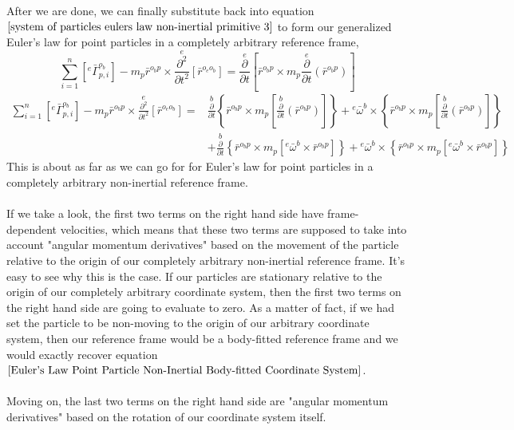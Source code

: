After we are done, we can finally substitute back into equation $\ref{system of particles eulers law non-inertial primitive 3}$ to form our generalized Euler's law for point particles in a completely arbitrary reference frame,
$$\sum^{n}_{i = 1}\left[{}^{e}\bar{\Gamma}^{o_{b}}_{p,i}\right] - m_{p}\bar{r}^{o_{b}p}\times\overset{e}{\frac{\partial^{2}}{\partial t^{2}}}[\bar{r}^{o_{e}o_{b}}] = 
\overset{e}{\frac{\partial}{\partial t}}\left[\bar{r}^{o_{b}p}\times m_{p}\overset{e}{\frac{\partial}{\partial t}}(\bar{r}^{o_{b}p})\right]$$
\begin{align*}
\sum^{n}_{i = 1}\left[{}^{e}\bar{\Gamma}^{o_{b}}_{p,i}\right] - m_{p}\bar{r}^{o_{b}p}\times\overset{e}{\frac{\partial^{2}}{\partial t^{2}}}[\bar{r}^{o_{e}o_{b}}] = &
\overset{b}{\frac{\partial}{\partial t}}\left\{\bar{r}^{o_{b}p}\times m_{p}\left[\overset{b}{\frac{\partial}{\partial t}}(\bar{r}^{o_{b}p})\right]\right\} 
 + {}^{e}\bar{\omega}^{b}\times\left\{\bar{r}^{o_{b}p}\times m_{p}\left[\overset{b}{\frac{\partial}{\partial t}}(\bar{r}^{o_{b}p})\right]\right\}
\\ & 
 + \overset{b}{\frac{\partial}{\partial t}}\left\{\bar{r}^{o_{b}p}\times m_{p}\left[{}^{e}\bar{\omega}^{b}\times\bar{r}^{o_{b}p}\right]\right\} 
 + {}^{e}\bar{\omega}^{b}\times\left\{\bar{r}^{o_{b}p}\times m_{p}\left[{}^{e}\bar{\omega}^{b}\times\bar{r}^{o_{b}p}\right]\right\}
\end{align*}
This is about as far as we can go for for Euler's law for point particles in a completely arbitrary non-inertial reference frame.
\\~\\If we take a look, the first two terms on the right hand side have frame-dependent velocities, which means that these two terms are supposed to take into account "angular momentum derivatives" based on the movement of the particle relative to the origin of our completely arbitrary non-inertial reference frame.
It's easy to see why this is the case.
If our particles are stationary relative to the origin of our completely arbitrary coordinate system, then the first two terms on the right hand side are going to evaluate to zero.
As a matter of fact, if we had set the particle to be non-moving to the origin of our arbitrary coordinate system, then our reference frame would be a body-fitted reference frame and we would exactly recover equation $\ref{Euler's Law Point Particle Non-Inertial Body-fitted Coordinate System}$.
\\~\\Moving on, the last two terms on the right hand side are "angular momentum derivatives" based on the rotation of our coordinate system itself.

